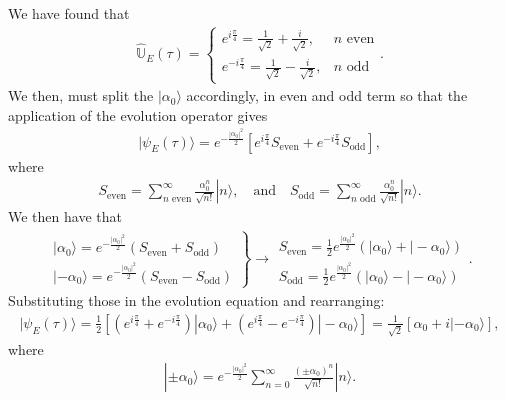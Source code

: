 \documentclass[letterpaper,11pt,twoside]{article}
\newcommand{\ket}[1]{|#1\rangle}
\begin{document}
\begin{enumerate}[itemsep=0pt,topsep=0pt,label=\alph*)]
\begin{align*}
  \end{align*}
  We have found that 
  \begin{align*}
    \hat{\mathbb{U}}_E(\tau)=\begin{cases}
      e^{i\frac{\pi}{4}}=\frac{1}{\sqrt{2}}+\frac{i}{\sqrt{2}},&\text{$n$ even}\\
      e^{-i\frac{\pi}{4}}=\frac{1}{\sqrt{2}}-\frac{i}{\sqrt{2}},&\text{$n$ odd}
    \end{cases}.
  \end{align*}
  We then, must split the $\ket{\alpha_0}$ accordingly, in even and odd term so that the application of the evolution operator gives
  \begin{align*}
    \ket{\psi_E(\tau)}=e^{-\frac{|\alpha_0|^2}{2}}\left[e^{i\frac{\pi}{4}}S_{\text{even}}+e^{-i\frac{\pi}{4}}S_{\text{odd}}\right],
  \end{align*}
  where 
  \begin{align}
    S_{\text{even}}=\sum_{\text{$n$ even}}^\infty\frac{\alpha_0^n}{\sqrt{n!}}\ket{n},\quad\text{and}\quad S_{\text{odd}}=\sum_{\text{$n$ odd}}^\infty\frac{\alpha_0^n}{\sqrt{n!}}\ket{n}.
  \end{align}
  We then have that 
  \begin{align*}
    \left.\begin{array}{l}
      \ket{\alpha_0}=e^{-\frac{|\alpha_0|^2}{2}}(S_{\text{even}}+S_{\text{odd}})\\
      \ket{-\alpha_0}=e^{-\frac{|\alpha_0|^2}{2}}(S_{\text{even}}-S_{\text{odd}})      
    \end{array}\right\}\longrightarrow\begin{array}{l}
      S_{\text{even}}=\frac{1}{2}e^{\frac{|\alpha_0|^2}{2}}(\ket{\alpha_0}+\ket{-\alpha_0})\\
      S_{\text{odd}}=\frac{1}{2}e^{\frac{|\alpha_0|^2}{2}}(\ket{\alpha_0}-\ket{-\alpha_0})
    \end{array}.
  \end{align*}
  Substituting those in the evolution equation and rearranging:
  \begin{align*}
    \ket{\psi_E(\tau)}=\frac{1}{2}\left[(e^{i\frac{\pi}{4}}+e^{-i\frac{\pi}{4}})\ket{\alpha_0}+(e^{i\frac{\pi}{4}}-e^{-i\frac{\pi}{4}})\ket{-\alpha_0}\right]=\frac{1}{\sqrt{2}}[\alpha_0+i\ket{-\alpha_0}],
  \end{align*}
  where 
  \begin{align*}
    \ket{\pm\alpha_0}=e^{-\frac{|\alpha_0|^2}{2}}\sum_{n=0}^\infty\frac{(\pm\alpha_0)^n}{\sqrt{n!}}\ket{n}.
  \end{align*}

\end{enumerate}
\end{document}
